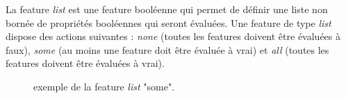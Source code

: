 \documentclass[manual-fr.tex]{subfiles}
\begin{document}
La feature \textit{list} est une feature booléenne qui permet de définir une liste non bornée de propriétés booléennes qui seront évaluées. Une feature de type \textit{list} dispose des actions suivantes : \textit{none} (toutes les features doivent être évaluées à faux), \textit{some} (au moins une feature doit être évaluée à vrai) et \textit{all} (toutes les features doivent être évaluées à vrai).

\begin{figure}[ht!]
\footnotesize
\begin{xml}
\end{xml}
\caption{exemple de la feature \textit{list} "some".}
\label{fig:feature-list-some}
\end{figure}
\end{document}
